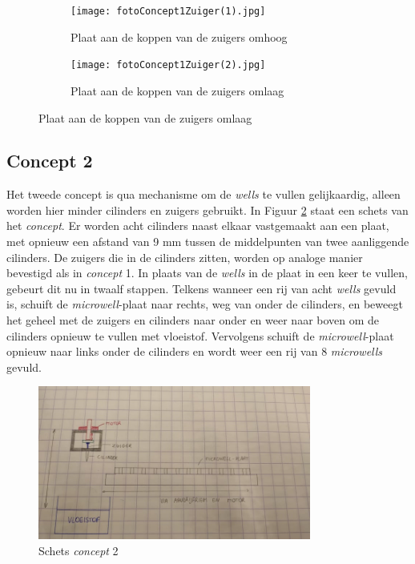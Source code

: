 \documentclass[a4paper,twoside,kulak]{kulakreport} %
\begin{document}
\begin{figure}
	\centering
	\begin{subfigure}{.5\textwidth}
		\centering
		\texttt{[image: fotoConcept1Zuiger(1).jpg]}
		\caption{Plaat aan de koppen van de zuigers omhoog}
	\end{subfigure}%
	\begin{subfigure}{.5\textwidth}
		\centering
		\texttt{[image: fotoConcept1Zuiger(2).jpg]}
		\caption{Plaat aan de koppen van de zuigers omlaag}
	\end{subfigure}
	\label{fig: foto concept 1 zuiger}
\end{figure}

\subsection{Concept 2}
Het tweede concept is qua mechanisme om de \textit{wells} te vullen gelijkaardig, alleen worden hier minder cilinders en zuigers gebruikt. In Figuur \ref{fig: schets concept 2} staat een schets van het \textit{concept}. Er worden acht cilinders naast elkaar vastgemaakt aan een plaat, met opnieuw een afstand van 9 mm tussen de middelpunten van twee aanliggende cilinders. De zuigers die in de cilinders zitten, worden op analoge manier bevestigd als in \textit{concept} 1. In plaats van de \textit{wells} in de plaat in een keer te vullen, gebeurt dit nu in twaalf stappen. Telkens wanneer een rij van acht \textit{wells} gevuld is, schuift de \textit{microwell}-plaat naar rechts, weg van onder de cilinders, en beweegt het geheel met de zuigers en cilinders naar onder en weer naar boven om de cilinders opnieuw te vullen met vloeistof. Vervolgens schuift de \textit{microwell}-plaat opnieuw naar links onder de cilinders en wordt weer een rij van 8 \textit{microwells} gevuld.

\begin{figure}[h]
	\centering
	\includegraphics[width=0.8\textwidth]{fotoConcept2.jpg}
	\caption{Schets \textit{concept} 2}
	\label{fig: schets concept 2}
	
\end{figure} 
\end{document}
